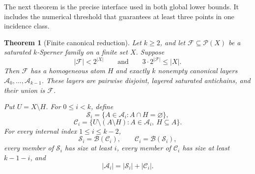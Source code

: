 \documentclass[a4paper,fleqn,longmktitle]{cas-sc}
\newtheorem{theorem}{Theorem}[section]
\theoremstyle{definition}
\theoremstyle{remark}
\newcommand{\powerset}{\mathcal{P}}
\newcommand{\family}{\mathcal{F}}
\newcommand{\blocker}{\mathcal{B}}
\begin{document}
The next theorem is the precise interface used in both global lower bounds.
It includes the numerical threshold that guarantees at least three points in
one incidence class.

\begin{theorem}[Finite canonical reduction]
\label{thm:canonical-reduction}
Let $k\geq2$, and let $\family\subseteq\powerset(X)$ be a saturated
$k$-Sperner family on a finite set $X$.  Suppose
\[
  |\family|<2^{|X|}
  \qquad\text{and}\qquad
  3\cdot2^{|\family|}\leq |X|.
  \tag{CR1}
\]
Then $\family$ has a homogeneous atom $H$ and exactly $k$ nonempty canonical
layers $\mathcal A_0,\ldots,\mathcal A_{k-1}$.  These layers are pairwise
disjoint, layered saturated antichains, and their union is $\family$.

Put $U=X\setminus H$.  For $0\leq i<k$, define
\[
  \mathcal S_i=\{A\in\mathcal A_i:A\cap H=\varnothing\},
\]
\[
  \mathcal C_i=
  \{U\setminus(A\setminus H):A\in\mathcal A_i,\ H\subseteq A\}.
\]
For every internal index $1\leq i\leq k-2$,
\[
  \mathcal S_i=\blocker(\mathcal C_i),\qquad
  \mathcal C_i=\blocker(\mathcal S_i),
  \tag{CR2}
\]
every member of $\mathcal S_i$ has size at least $i$, every member of
$\mathcal C_i$ has size at least $k-1-i$, and
\[
  |\mathcal A_i|=|\mathcal S_i|+|\mathcal C_i|.
  \tag{CR3}
\]
\end{theorem}
\end{document}
